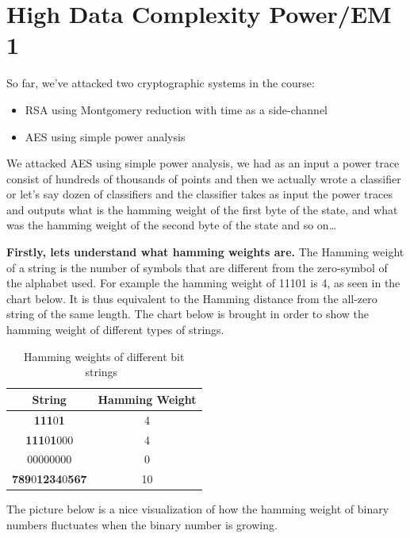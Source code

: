 \chapter{High Data Complexity Power/EM 1} \label{cha:High Data Complexity Power/EM 1}

So far, we've attacked two cryptographic systems in the course:
\begin{itemize}
    \item RSA using Montgomery reduction with time as a side-channel
    \item AES using simple power analysis
\end{itemize}

We attacked AES using simple power analysis, we had as an input a power trace
consist of hundreds of thousands of points and then we actually wrote a
classifier or let's say dozen of classifiers and the classifier takes as input
the power traces and outputs what is the hamming weight of the first byte of the
state, and what was the hamming weight of the second byte of the state and so
on\ldots


\textbf{Firstly, lets understand what hamming weights are.}
The Hamming weight of a string is the number of symbols that are different from the zero-symbol of the alphabet used. For example the hamming weight of 11101 is 4, as seen in the chart below. It is thus equivalent to the Hamming distance from the all-zero string of the same length.
The chart below is brought in order to show the hamming weight of different types of strings.

\begin{table}
    \caption{Hamming weights of different bit strings~\cite{hamming}}\label{hammingWeights}
    \begin{center}
    \begin{tabular}{ cc }
        \toprule
        String & Hamming Weight \\ 
        \midrule
        \textbf{111}0\textbf{1} & 4 \\ 
        \textbf{111}0\textbf{1}000 & 4 \\
        00000000 & 0 \\
        \textbf{789}0\textbf{1234}0\textbf{567} & 10 \\
        \bottomrule
    \end{tabular}
    \end{center}
\end{table}

The picture below is a nice visualization of how the hamming weight of binary numbers fluctuates when the binary number is growing.

